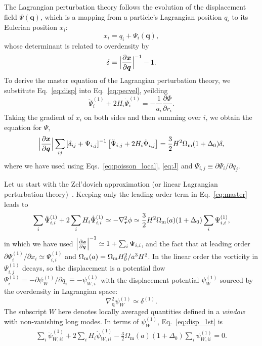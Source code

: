 \documentclass[a4paper,11pt]{article}
\newcommand{\vr}{{\bm r}}
\newcommand{\vx}{{\bm x}}
\newcommand{\vq}{{\bm q}}
\begin{document}
The Lagrangian perturbation theory follows the evolution of the displacement field $\Psi(\vq)$,
which is a mapping from a particle's Lagrangian
position $q_i$ to its Eulerian position $x_i$:
\begin{equation}
    x_i = q_i + \Psi_i({\vq}),
    \label{eq:disp}
\end{equation}
whose determinant is related to overdensity by
\begin{equation}
    \delta = \Bigl| \frac{\partial{\vx}}{\partial{\vq}} \Bigr|^{-1} - 1.
    \label{eq:J}
\end{equation}
To derive the master equation of the Lagrangian perturbation theory,  we substitute Eq.~\eqref{eq:disp} into Eq.~\eqref{eq:pecvel}, yeilding 
\begin{equation}
    \ddot \Psi_i^{(1)} + 2 H_i \dot \Psi_i^{(1)} = - \frac1{a_i}
    \frac{\partial\Phi}{\partial r_i}.
\end{equation}
Taking the gradient of $x_i$ on both sides and then summing over $i$,
we obtain the equation for $\Psi$,
\begin{align}
    \Bigl| \frac{\partial{\vx}}{\partial{\vq}} \Bigr| 
    \sum_{ij}
    \left[\delta_{ij} + \Psi_{i,j}  \right]^{-1}
    \left[ \ddot{\Psi}_{i,j} + 2H_i\dot{\Psi}_{i,j} \right]
    =\frac{3}{2}H^2\Omega_{\rm m}(1+\Delta_0)
    \delta,
    \label{eq:master}
\end{align}
where we have used using Eqs.~\eqref{eq:poisson_local}, \eqref{eq:J} and $\Psi_{i,j} \equiv \partial\Psi_i / \partial q_j$.


Let us start with the Zel'dovich approximation (or linear Lagrangian
perturbation theory)~\cite{Zeldovich:1969}.
Keeping only the leading order term in Eq.~\eqref{eq:master} leads to 
\begin{equation}
    \sum_i\ddot \Psi_{i,i}^{(1)} + 2 \sum_i H_i \dot \Psi_{i,i}^{(1)} \simeq - \nabla_{\vr}^2 \phi
    \simeq \frac{3}{2}H^2 \Omega_{\rm m}(a)  (1 + \Delta_0)\sum_i\Psi_{i,i}^{(1)},
    \label{eq:disp_1st}
\end{equation}
in which we have used $\Bigl| \frac{\partial{\vx}}{\partial{\vq}} \Bigr|^{-1} \simeq 1 + \sum_i\Psi_{i,i}$,
 and the fact that at leading order $\partial\Psi_i^{(1)} / \partial x_i \simeq \Psi_{i,i}^{(1)}$
and $\Omega_{\rm m}(a) =  \Omega_{\rm m}H_0^2/a^3H^2$.
In the linear order the vorticity in $\Psi_{i,j}^{(1)}$ decays, so the displacement
is a potential flow $\Psi_i^{(1)} = - \partial\psi_W^{(1)}/ \partial q_i \equiv -\psi_{W,i}^{(1)}$
with the displacement potential $\psi_W^{(1)}$ sourced by the overdensity in Lagrangian
space:
\begin{equation}
    \nabla_{\vq}^2 \psi_W^{(1)} \simeq \delta^{(1)}.
\end{equation}
The subscript $W$ here
denotes locally averaged quantities
defined in a \emph{window} with non-vanishing long modes.
In terms of $\psi_W^{(1)}$, Eq.~\eqref{eq:disp_1st} is 
\begin{align}
  \sum_i \ddot \psi^{(1)}_{W,ii} + 2\sum_i H_i  \dot\psi^{(1)}_{W,ii}
   - \frac32  \Omega_\mathrm{m}(a) (1 + \Delta_0)\sum_i \psi^{(1)}_{W,ii} = 0.
   \label{eq:psiW_1st}
\end{align}
\end{document}
